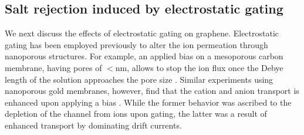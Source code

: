 \documentclass[journal=langd5,email=true, hyperref=true, keywords=false]{achemso}
\begin{document}
\subsection*{Salt rejection induced by electrostatic gating}
\label{sec:res-2}

We next discuss the effects of electrostatic gating on graphene. 
{ Electrostatic gating has been employed previously to alter the 
ion permeation through nanoporous structures. For example, an applied bias on a mesoporous 
carbon membrane, having pores of $<$\unit[5]{nm}, allows to stop the 
ion flux once the Debye length of the solution approaches the pore size \cite{Surwade_2014}. 
Similar experiments using nanoporous gold membranes, however, find that the cation and anion 
transport is enhanced upon applying a bias \cite{mccurry2017electrolyte}. While the former behavior 
was ascribed to the depletion of the channel from ions upon gating, the latter was a result of enhanced transport
by dominating drift currents.}
\end{document}

